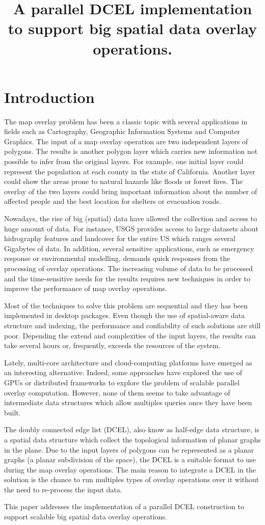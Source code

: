 \documentclass[a4paper,10pt]{article}
\title{A parallel DCEL implementation to support big spatial data overlay
operations.}
\author{}
\begin{document}
\section{Introduction}

The map overlay problem has been a classic topic with several applications in fields such as Cartography, Geographic Information Systems and Computer Graphics.  The input of a map overlay operation are two independent layers of polygons. The results is another polygon layer which carries new information not possible to infer from the original layers. For example, one initial layer could represent the population at each county in the state of California.  Another layer could show the areas prone to natural hazards like floods or forest fires.  The overlay of the two layers could bring important information about the number of affected people and the best location for shelters or evacuation roads.

Nowadays, the rise of big (spatial) data have allowed the collection and access to huge amount of data.  For instance, USGS provides access to large datasets about hidrography features and landcover for the entire US which ranges several Gigabytes of data. In addition, several sensitive applications, such as emergency response or environmental modelling, demands quick responses from the processing of overlay operations. The increasing volume of data to be processed and the time-sensitive needs for the results requires new techniques in order to improve the performance of map overlay operations.

Most of the techniques to solve this problem are sequential and they has been implemented in desktop packages. Even though the use of spatial-aware data structure and indexing, the performance and confiability of such solutions are still poor. Depending the extend and complexities of the input layers, the results can take several hours or, frequently, exceeds the resources of the system.  

Lately, multi-core architecture and cloud-computing platforms have emerged as an interesting alternative.  Indeed, some approaches have explored the use of GPUs or distributed frameworks to explore the problem of scalable parallel overlay computation.  However, none of them seems to take advantage of intermediate data structures which allow multiples queries once they have been built.

The doubly connected edge list (DCEL), also know as half-edge data structure, is a spatial data structure which collect the topological information of planar graphs in the plane.  Due to the input layers of polygons can be represented as a planar graphs (a planar subdivision of the space), the DCEL is a suitable format to use during the map overlay operations.  The main reason to integrate a DCEL in the solution is the chance to run multiples types of overlay operations over it without the need to re-process the input data.

This paper addresses the implementation of a parallel DCEL construction to support scalable big spatial data overlay operations.
\end{document}
